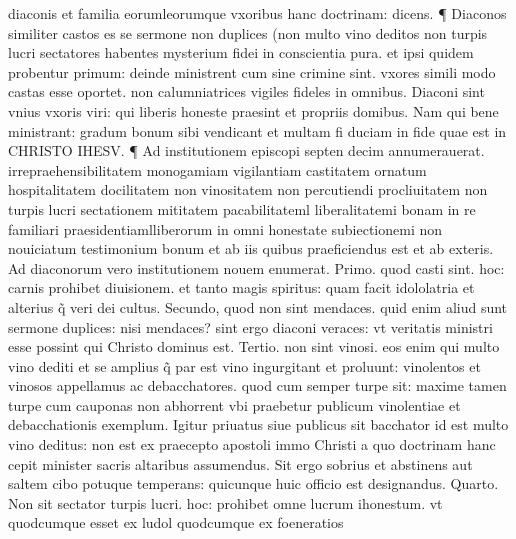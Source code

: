 \documentclass{article}
\begin{document}
\begin{pages}
diaconis et familia eorumleorumque vxoribus hanc doctrinam: dicens. ¶ Diaconos similiter castos es se sermone non duplices (non multo vino deditos non turpis lucri sectatores habentes mysterium fidei in conscientia pura. et ipsi quidem probentur primum: deinde ministrent  cum sine crimine sint. vxores simili modo castas esse oportet. non calumniatrices vigiles  fideles in omnibus. Diaconi sint vnius vxoris viri: qui liberis honeste praesint et propriis domibus. Nam qui bene ministrant: gradum bonum sibi vendicant et multam fi duciam in fide quae est in CHRISTO IHESV. ¶ Ad institutionem episcopi septen decim annumerauerat. irrepraehensibilitatem monogamiam vigilantiam castitatem ornatum hospitalitatem docilitatem non vinositatem non percutiendi procliuitatem non turpis lucri sectationem mititatem pacabilitateml liberalitatemi bonam in re familiari praesidentiamlliberorum in omni honestate subiectionemi non nouiciatum testimonium bonum et ab iis quibus praeficiendus est et ab exteris. Ad diaconorum vero institutionem nouem enumerat. Primo. quod casti sint. hoc: carnis prohibet diuisionem. et tanto magis spiritus: quam facit idololatria et alterius q̃ veri dei cultus. Secundo, quod non sint mendaces. quid enim aliud sunt sermone duplices: nisi mendaces? sint ergo diaconi veraces: vt veritatis ministri esse possint qui Christo dominus est. Tertio. non sint vinosi. eos enim qui multo vino dediti et se amplius q̃ par est vino ingurgitant et proluunt: vinolentos et vinosos appellamus ac debacchatores. quod cum semper turpe sit: maxime tamen turpe cum cauponas non abhorrent vbi praebetur publicum vinolentiae et debacchationis exemplum. Igitur priuatus siue publicus sit bacchator id est multo vino deditus: non est ex praecepto apostoli immo Christi a quo doctrinam hanc cepit minister sacris altaribus assumendus. Sit ergo sobrius et abstinens aut saltem cibo potuque  temperans: quicunque huic officio est designandus. Quarto. Non sit sectator turpis lucri. hoc: prohibet omne lucrum ihonestum. vt quodcumque esset ex ludol quodcumque ex foeneratios  \pend

\end{pages}
\end{document}
